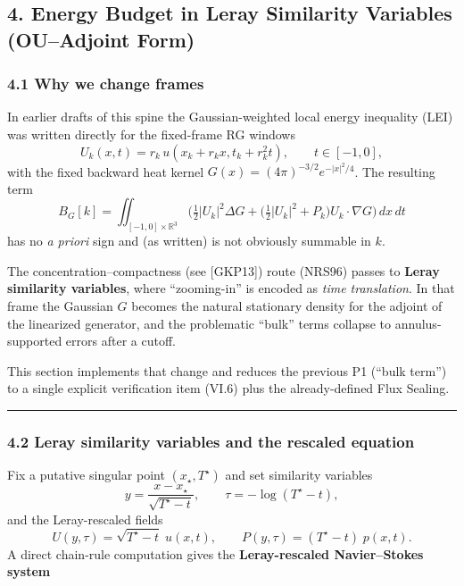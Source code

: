\documentclass[
  11pt,
]{article}
\begin{document}
\hypertarget{energy-budget-in-leray-similarity-variables-ouadjoint-form}{%
\subsection{4. Energy Budget in Leray Similarity Variables (OU--Adjoint Form)}\label{energy-budget-in-leray-similarity-variables-ouadjoint-form}}

\hypertarget{why-we-change-frames}{%
\subsubsection{4.1 Why we change frames}\label{why-we-change-frames}}

In earlier drafts of this spine the Gaussian-weighted local energy inequality (LEI) was written directly for the fixed-frame RG windows \[
U_k(x,t)=r_k\,u(x_k+r_k x,t_k+r_k^2 t),\qquad t\in[-1,0],
\] with the fixed backward heat kernel \(G(x)= (4\pi)^{-3/2}e^{-|x|^2/4}\). The resulting term \[
B_G[k]=\iint_{[-1,0]\times\mathbb{R}^3}\Big(\tfrac12|U_k|^2\Delta G+\big(\tfrac12|U_k|^2+P_k\big)U_k\cdot\nabla G\Big)\,dx\,dt
\] has no \emph{a priori} sign and (as written) is not obviously summable in \(k\).

The concentration--compactness (see {[}GKP13{]}) route (NRS96) passes to \textbf{Leray similarity variables}, where ``zooming-in'' is encoded as \emph{time translation}. In that frame the Gaussian \(G\) becomes the natural stationary density for the adjoint of the linearized generator, and the problematic ``bulk'' terms collapse to annulus-supported errors after a cutoff.

This section implements that change and reduces the previous P1 (``bulk term'') to a single explicit verification item (VI.6) plus the already-defined Flux Sealing.

\begin{center}\rule{0.5\linewidth}{0.5pt}\end{center}

\hypertarget{leray-similarity-variables-and-the-rescaled-equation}{%
\subsubsection{4.2 Leray similarity variables and the rescaled equation}\label{leray-similarity-variables-and-the-rescaled-equation}}

Fix a putative singular point \((x_\star,T^\star)\) and set similarity variables \[
y=\frac{x-x_\star}{\sqrt{T^\star-t}},\qquad \tau=-\log(T^\star-t),
\] and the Leray-rescaled fields \[
U(y,\tau)=\sqrt{T^\star-t}\;u(x,t),\qquad P(y,\tau)=(T^\star-t)\;p(x,t).
\] A direct chain-rule computation gives the \textbf{Leray-rescaled Navier--Stokes system}
\end{document}
